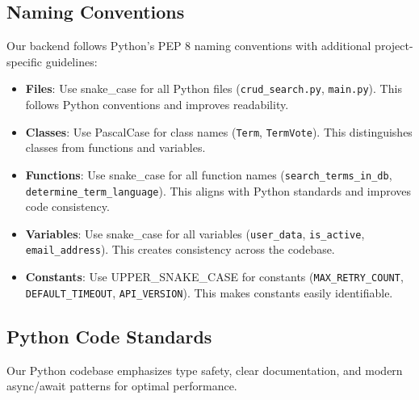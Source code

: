 \documentclass[12pt]{article}
\begin{document}
\subsection{Naming Conventions}
Our backend follows Python's PEP 8 naming conventions with additional project-specific guidelines:

\begin{itemize}
    \item \textbf{Files}: Use snake\_case for all Python files (\texttt{crud\_search.py}, \texttt{main.py}). This follows Python conventions and improves readability.
    
    \item \textbf{Classes}: Use PascalCase for class names (\texttt{Term}, \texttt{TermVote}). This distinguishes classes from functions and variables.
    
    \item \textbf{Functions}: Use snake\_case for all function names (\texttt{search\_terms\_in\_db}, \texttt{determine\_term\_language}). This aligns with Python standards and improves code consistency.
    
    \item \textbf{Variables}: Use snake\_case for all variables (\texttt{user\_data}, \texttt{is\_active}, \texttt{email\_address}). This creates consistency across the codebase.
    
    \item \textbf{Constants}: Use UPPER\_SNAKE\_CASE for constants (\texttt{MAX\_RETRY\_COUNT}, \texttt{DEFAULT\_TIMEOUT}, \texttt{API\_VERSION}). This makes constants easily identifiable.
\end{itemize}

\subsection{Python Code Standards}
Our Python codebase emphasizes type safety, clear documentation, and modern async/await patterns for optimal performance.
\end{document}

